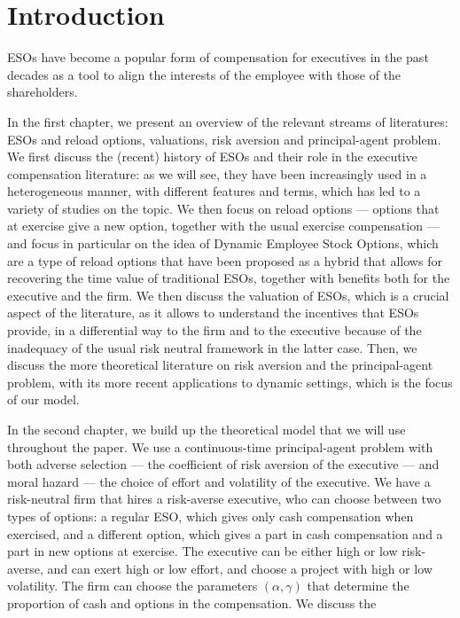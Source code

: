 \section{Introduction}



ESOs have become a popular form of compensation for executives in the past decades as a tool to align the interests of the employee with those of the shareholders. 




In the first chapter, we present an overview of the relevant streams of literatures: ESOs and reload options, valuations, risk aversion and principal-agent problem. We first discuss the (recent) history of ESOs and their role in the executive compensation literature: as we will see, they have been increasingly used in a heterogeneous manner, with different features and terms, which has led to a variety of studies on the topic. We then focus on reload options --- options that at exercise give a new option, together with the usual exercise compensation --- and focus in particular on the idea of Dynamic Employee Stock Options, which are a type of reload options that have been proposed as a hybrid that allows for recovering the time value of traditional ESOs, together with benefits both for the executive and the firm. We then discuss the valuation of ESOs, which is a crucial aspect of the literature, as it allows to understand the incentives that ESOs provide, in a differential way to the firm and to the executive because of the inadequacy of the usual risk neutral framework in the latter case. Then, we discuss the more theoretical literature on risk aversion and the principal-agent problem, with its more recent applications to dynamic settings, which is the focus of our model.

In the second chapter, we build up the theoretical model that we will use throughout the paper. We use a continuous-time principal-agent problem with both adverse selection --- the coefficient of risk aversion of the executive --- and moral hazard --- the choice of effort and volatility of the executive. We have a risk-neutral firm that hires a risk-averse executive, who can choose between two types of options: a regular ESO, which gives only cash compensation when exercised, and a different option, which gives a part in cash compensation and a part in  new options at exercise. The executive can be either high or low risk-averse, and can exert high or low effort, and choose a project with high or low volatility. The firm can choose the parameters $(\alpha, \gamma)$ that determine the proportion of cash and options in the compensation. We discuss the 

